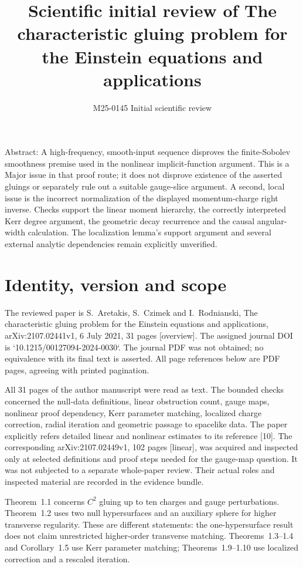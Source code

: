 \documentclass[10pt]{article}
\title{Scientific initial review of
The characteristic gluing problem for the Einstein equations and applications}
\author{M25-0145 Initial scientific review}
\date{}
\begin{document}
\maketitle
Abstract: A high-frequency, smooth-input sequence disproves the finite-Sobolev smoothness premise used in the nonlinear implicit-function argument. This is a Major issue in that proof route; it does not disprove existence of the asserted gluings or separately rule out a suitable gauge-slice argument. A second, local issue is the incorrect normalization of the displayed momentum-charge right inverse. Checks support the linear moment hierarchy, the correctly interpreted Kerr degree argument, the geometric decay recurrence and the causal angular-width calculation. The localization lemma’s support argument and several external analytic dependencies remain explicitly unverified.\par
\section*{Identity, version and scope}
The reviewed paper is S. Aretakis, S. Czimek and I. Rodnianski, The characteristic gluing problem for the Einstein equations and applications, arXiv:2107.02441v1, 6 July 2021, 31 pages [overview]. The assigned journal DOI is `10.1215/00127094-2024-0030`. The journal PDF was not obtained; no equivalence with its final text is asserted. All page references below are PDF pages, agreeing with printed pagination.\par
All 31 pages of the author manuscript were read as text. The bounded checks concerned the null-data definitions, linear obstruction count, gauge maps, nonlinear proof dependency, Kerr parameter matching, localized charge correction, radial iteration and geometric passage to spacelike data. The paper explicitly refers detailed linear and nonlinear estimates to its reference [10]. The corresponding arXiv:2107.02449v1, 102 pages [linear], was acquired and inspected only at selected definitions and proof steps needed for the gauge-map question. It was not subjected to a separate whole-paper review. Their actual roles and inspected material are recorded in the evidence bundle.\par
Theorem 1.1 concerns \(C^2\) gluing up to ten charges and gauge perturbations. Theorem 1.2 uses two null hypersurfaces and an auxiliary sphere for higher transverse regularity. These are different statements: the one-hypersurface result does not claim unrestricted higher-order transverse matching. Theorems 1.3–1.4 and Corollary 1.5 use Kerr parameter matching; Theorems 1.9–1.10 use localized correction and a rescaled iteration.\par
\end{document}

